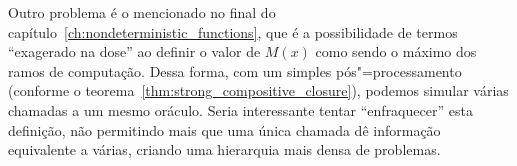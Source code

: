 Outro problema é o mencionado no final do capítulo~\ref{ch:nondeterministic_functions},
que é a possibilidade de termos ``exagerado na dose''
ao definir o valor de $M(x)$ como sendo o máximo dos ramos de computação.
Dessa forma,
com um simples pós"=processamento
(conforme o teorema~\ref{thm:strong_compositive_closure}),
podemos simular várias chamadas a um mesmo oráculo.
Seria interessante tentar ``enfraquecer'' esta definição,
não permitindo mais que uma única chamada
dê informação equivalente a várias,
criando uma hierarquia mais densa de problemas.
